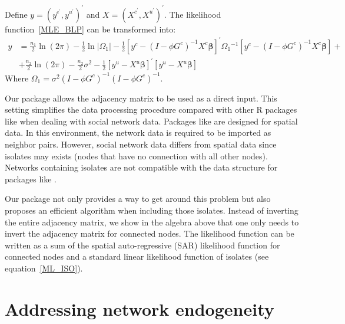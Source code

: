 \documentclass[nojss]{jss}
\begin{document}
	Define $y=\left( y^{c^{\prime }},y^{u^{\prime }}\right) ^{\prime }$ and $X=\left( X^{c^{\prime }},X^{u^{\prime }}\right) ^{\prime }$. The likelihood function~\ref{MLE_BLP} can be transformed into:
	\begin{equation}
	\begin{split}
	y&=\frac{n_{1}}{2}\ln \left( 2\pi \right) -\frac{1}{2}\ln |\Omega _{1}|-\frac{1}{2}\left[ y^{c}-(I-\phi G^{c})^{-1}X^{c}\mathbf{\beta } \right] ^{\prime}\Omega _{1}{}^{-1}\left[y^{c}-(I-\phi G^{c})^{-1}X^{c} \mathbf{\beta }\right] + \\
	&+\frac{n_{2}}{2}\ln \left( 2\pi \right) - \frac{n_{2}}{2}\sigma ^{2}-\frac{1}{2}\left[ y^{u}-X^{u}\mathbf{\beta}\right] ^{\prime }\left[ y^{u}-X^{u}\mathbf{\beta}\right]
	\label{ML_ISO}
	\end{split}
	\end{equation}
	Where $\Omega _{1}=\sigma ^{2}(I-\phi G^{c})^{-1}(I-\phi G^{c})^{-1}$.
	
	Our package allows the adjacency matrix to be used as a direct input. This setting simplifies the data processing procedure compared with other R packages like  when dealing with social network data. Packages like  are designed for spatial data. In this environment, the network data is required to be imported as neighbor pairs. However, social network data differs from spatial data since isolates may exists
	(nodes that have no connection with all other nodes). Networks containing isolates are not compatible with the data structure for packages like .
	
	Our package not only provides a way to get around this problem but also proposes an efficient algorithm when including those isolates. Instead of inverting the entire adjacency matrix, we show in the algebra above that one only needs to invert the adjacency matrix for connected nodes. The likelihood function can be written as a sum of the spatial auto-regressive (SAR) likelihood function for connected nodes and a standard linear
	likelihood function of isolates (see equation~\ref{ML_ISO}).
	
	\section{Addressing network endogeneity} \label{sec:endogeneity}
	
\end{document}

